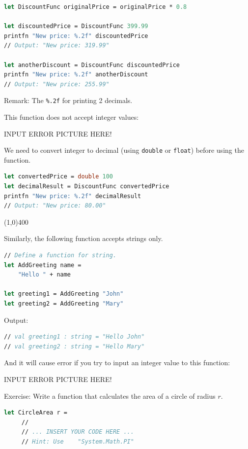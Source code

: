 \documentclass[12pt]{article}
\begin{document}
\begin{lstlisting}[language=FSharp]
let DiscountFunc originalPrice = originalPrice * 0.8

let discountedPrice = DiscountFunc 399.99
printfn "New price: %.2f" discountedPrice
// Output: "New price: 319.99"

let anotherDiscount = DiscountFunc discountedPrice
printfn "New price: %.2f" anotherDiscount
// Output: "New price: 255.99"
\end{lstlisting}
Remark: The \texttt{\%.2f} for printing 2 decimals.

This function does not accept integer values:
\begin{center}
INPUT ERROR PICTURE HERE!
\end{center}

We need to convert integer to decimal (using \texttt{double} or \texttt{float}) before using the function.

\begin{lstlisting}[language=FSharp]
let convertedPrice = double 100
let decimalResult = DiscountFunc convertedPrice
printfn "New price: %.2f" decimalResult
// Output: "New price: 80.00"
\end{lstlisting}
\begin{center}
\line(1,0){400}
\end{center}
Similarly, the following function accepts strings only.
\begin{lstlisting}[language=FSharp]
// Define a function for string.
let AddGreeting name =
    "Hello " + name

let greeting1 = AddGreeting "John"
let greeting2 = AddGreeting "Mary"
\end{lstlisting}
Output:
\begin{lstlisting}[language=FSharp]
// val greeting1 : string = "Hello John"
// val greeting2 : string = "Hello Mary"
\end{lstlisting}
And it will cause error if you try to input an integer value to this function:
\begin{center}
INPUT ERROR PICTURE HERE!
\end{center}
\pagebreak
Exercise: Write a function that calculates the area of a circle of radius $r$. 



\begin{lstlisting}[language=FSharp]
let CircleArea r =
     //
     // ... INSERT YOUR CODE HERE ...
     // Hint: Use    "System.Math.PI"
\end{lstlisting}
\end{document}
